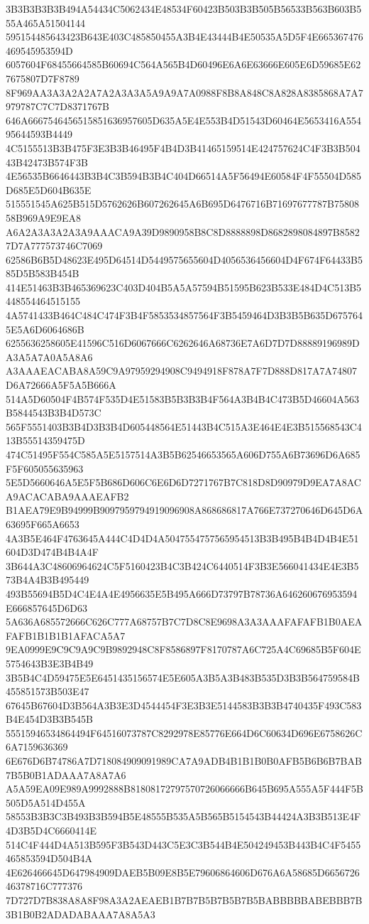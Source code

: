 {{{{{{{{{{{{{{{{{{{{{3B3B3B3B3B494A54434C5062434E48534F60423B503B3B505B56533B563B603B555A465A51504144
595154485643423B643E403C485850455A3B4E43444B4E50535A5D5F4E665367476469545953594D
6057604F68455664585B60694C564A565B4D60496E6A6E63666E605E6D59685E627675807D7F8789
8F969AA3A3A2A2A7A2A3A3A5A9A9A7A0988F8B8A848C8A828A8385868A7A7979787C7C7D8371767B
646A6667546456515851636957605D635A5E4E553B4D51543D60464E5653416A55495644593B4449
4C5155513B3B475F3E3B3B46495F4B4D3B41465159514E424757624C4F3B3B50443B42473B574F3B
4E56535B6646443B3B4C3B594B3B4C404D66514A5F56494E60584F4F55504D585D685E5D604B635E
515551545A625B515D5762626B607262645A6B695D6476716B71697677787B7580858B969A9E9EA8
A6A2A3A3A2A3A9AAACA9A39D9890958B8C8D8888898D8682898084897B85827D7A777573746C7069
62586B6B5D48623E495D64514D5449575655604D4056536456604D4F674F64433B585D5B583B454B
414E51463B3B465369623C403D404B5A5A57594B51595B623B533E484D4C513B5448554464515155
4A5741433B464C484C474F3B4F5853534857564F3B5459464D3B3B5B635D6757645E5A6D6064686B
6255636258605E41596C516D6067666C6262646A68736E7A6D7D7D88889196989DA3A5A7A0A5A8A6
A3AAAEACABA8A59C9A97959294908C9494918F878A7F7D888D817A7A74807D6A72666A5F5A5B666A
514A5D60504F4B574F535D4E51583B5B3B3B4F564A3B4B4C473B5D46604A563B5844543B3B4D573C
565F5551403B3B4D3B3B4D605448564E51443B4C515A3E464E4E3B515568543C413B55514359475D
474C51495F554C585A5E5157514A3B5B62546653565A606D755A6B73696D6A685F5F605055635963
5E5D5660646A5E5F5B686D606C6E6D6D7271767B7C818D8D90979D9EA7A8ACA9ACACABA9AAAEAFB2
B1AEA79E9B94999B9097959794919096908A868686817A766E737270646D645D6A63695F665A6653
4A3B5E464F4763645A444C4D4D4A5047554757565954513B3B495B4B4D4B4E51604D3D474B4B4A4F
3B644A3C48606964624C5F5160423B4C3B424C6440514F3B3E566041434E4E3B573B4A4B3B495449
493B55694B5D4C4E4A4E4956635E5B495A666D73797B78736A646260676953594E666857645D6D63
5A636A685572666C626C777A68757B7C7D8C8E9698A3A3AAAFAFAFB1B0AEAFAFB1B1B1B1AFACA5A7
9EA0999E9C9C9A9C9B9892948C8F8586897F8170787A6C725A4C69685B5F604E5754643B3E3B4B49
3B5B4C4D59475E5E6451435156574E5E605A3B5A3B483B535D3B3B564759584B455851573B503E47
67645B67604D3B564A3B3E3D4544454F3E3B3E5144583B3B3B4740435F493C583B4E454D3B3B545B
55515946534864494F64516073787C8292978E85776E664D6C60634D696E6758626C6A7159636369
6E676D6B74786A7D718084909091989CA7A9ADB4B1B1B0B0AFB5B6B6B7BAB7B5B0B1ADAAA7A8A7A6
A5A59EA09E989A9992888B81808172797570726066666B645B695A555A5F444F5B505D5A514D455A
58553B3B3C3B493B3B594B5E48555B535A5B565B5154543B44424A3B3B513E4F4D3B5D4C6660414E
514C4F444D4A513B595F3B543D443C5E3C3B544B4E504249453B443B4C4F5455465853594D504B4A
4E626466645D647984909DAEB5B09E8B5E79606864606D676A6A58685D665672646378716C777376
7D727D7B838A8A8F98A3A2AEAEB1B7B7B5B7B5B7B5BABBBBBABEBBB7B3B1B0B2ADADABAAA7A8A5A3
}}}}}}}}}}}}}}}}}}}}}
